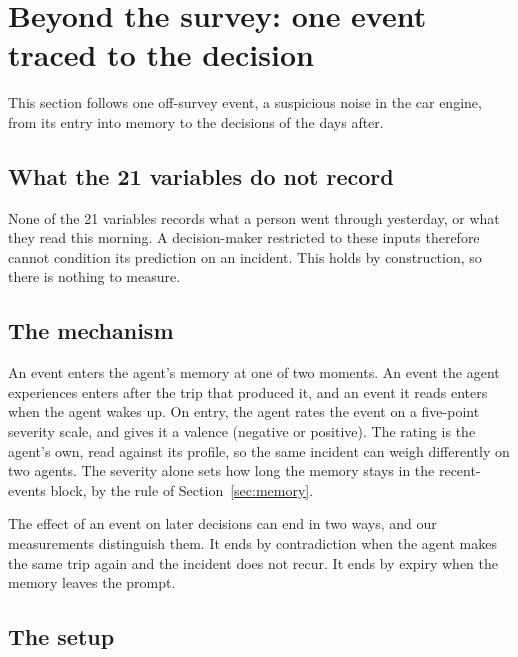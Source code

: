 \section{Beyond the survey: one event traced to the decision}
\label{sec:nontabulated}

This section follows one off-survey event, a suspicious noise in the car engine, from its entry into memory to
the decisions of the days after.

\subsection{What the 21 variables do not record}
\label{sec:variables-gap}

None of the 21 variables records what a person went through yesterday, or what they read
this morning. A decision-maker restricted to these inputs therefore cannot condition its
prediction on an incident. This holds by construction, so there is nothing to measure.

\subsection{The mechanism}
\label{sec:mechanism}

An event enters the agent's memory at one of two moments. An event the agent experiences
enters after the trip that produced it, and an event it reads enters when the agent wakes up.
On entry, the agent rates the event on a five-point severity scale, and gives it a valence
(negative or positive). The rating is the agent's own, read against its profile, so the same
incident can weigh differently on two agents. The severity alone sets how long the memory
stays in the recent-events block, by the rule of Section~\ref{sec:memory}.

The effect of an event on later decisions can end in two ways, and our measurements
distinguish them. It ends by contradiction when the agent makes the same trip again and the
incident does not recur. It ends by expiry when the memory leaves the prompt.

\subsection{The setup}
\label{sec:setup}

